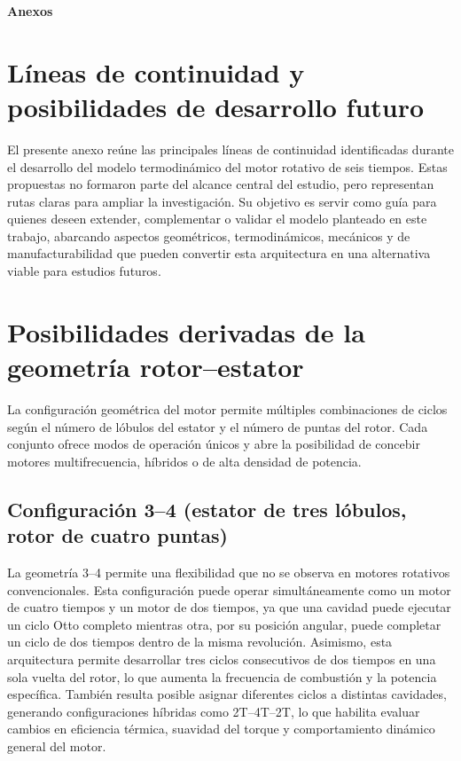 \documentclass[a4paper,12pt]{article}
\begin{document}
\begin{center}
    \Large \textbf{Anexos}
\end{center}

\renewcommand{\thefigure}{A\arabic{figure}}
\setcounter{figure}{0}

\section{Líneas de continuidad y posibilidades de desarrollo futuro}

El presente anexo reúne las principales líneas de continuidad identificadas durante el desarrollo del modelo termodinámico del motor rotativo de seis tiempos. Estas propuestas no formaron parte del alcance central del estudio, pero representan rutas claras para ampliar la investigación. Su objetivo es servir como guía para quienes deseen extender, complementar o validar el modelo planteado en este trabajo, abarcando aspectos geométricos, termodinámicos, mecánicos y de manufacturabilidad que pueden convertir esta arquitectura en una alternativa viable para estudios futuros.

\section{Posibilidades derivadas de la geometría rotor–estator}

La configuración geométrica del motor permite múltiples combinaciones de ciclos según el número de lóbulos del estator y el número de puntas del rotor. Cada conjunto ofrece modos de operación únicos y abre la posibilidad de concebir motores multifrecuencia, híbridos o de alta densidad de potencia.

\subsection{Configuración 3--4 (estator de tres lóbulos, rotor de cuatro puntas)}

La geometría 3--4 permite una flexibilidad que no se observa en motores rotativos convencionales. Esta configuración puede operar simultáneamente como un motor de cuatro tiempos y un motor de dos tiempos, ya que una cavidad puede ejecutar un ciclo Otto completo mientras otra, por su posición angular, puede completar un ciclo de dos tiempos dentro de la misma revolución. Asimismo, esta arquitectura permite desarrollar tres ciclos consecutivos de dos tiempos en una sola vuelta del rotor, lo que aumenta la frecuencia de combustión y la potencia específica. También resulta posible asignar diferentes ciclos a distintas cavidades, generando configuraciones híbridas como 2T--4T--2T, lo que habilita evaluar cambios en eficiencia térmica, suavidad del torque y comportamiento dinámico general del motor.
\end{document}
